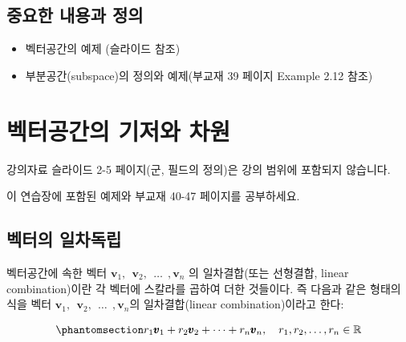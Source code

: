 \documentclass[
  11pt,
  a4paper,
  oneside]{scrbook}
\providecommand{\tightlist}{%
  \setlength{\itemsep}{0pt}\setlength{\parskip}{0pt}}\usepackage{longtable,booktabs,array}
\newcommand{\RR}{\mathbb{R}}
\theoremstyle{definition}
\theoremstyle{definition}
\theoremstyle{plain}
\theoremstyle{remark}
\begin{document}
\section{중요한 내용과
정의}\label{uxc911uxc694uxd55c-uxb0b4uxc6a9uxacfc-uxc815uxc758-4}

\begin{itemize}
\tightlist
\item
  벡터공간의 예제 (슬라이드 참조)
\item
  부분공간(subspace)의 정의와 예제(부교재 39 페이지 Example 2.12 참조)
\end{itemize}


\chapter{벡터공간의 기저와 차원}\label{vector_space_base}

\begin{tcolorbox}[enhanced jigsaw, colback=white, colframe=quarto-callout-note-color-frame, opacityback=0, toprule=.15mm, leftrule=.75mm, titlerule=0mm, opacitybacktitle=0.6, title=\textcolor{quarto-callout-note-color}{\faInfo}\hspace{0.5em}{노트}, colbacktitle=quarto-callout-note-color!10!white, breakable, bottomrule=.15mm, bottomtitle=1mm, toptitle=1mm, arc=.35mm, left=2mm, rightrule=.15mm, coltitle=black]

강의자료 슬라이드 2-5 페이지(군, 필드의 정의)은 강의 범위에 포함되지
않습니다.

이 연습장에 포함된 예제와 부교재 40-47 페이지를 공부하세요.

\end{tcolorbox}

\section{벡터의
일차독립}\label{uxbca1uxd130uxc758-uxc77cuxcc28uxb3c5uxb9bd}

벡터공간에 속한 벡터 \(\pmb v_1, ~~ \pmb v_2, ~~\dots ~~, \pmb v_n\) 의
일차결합(또는 선형결합, linear combination)이란 각 벡터에 스칼라를
곱하여 더한 것들이다. 즉 다음과 같은 형태의 식을 벡터
\(\pmb v_1, ~~ \pmb v_2, ~~\dots ~~, \pmb v_n\)의 일차결합(linear
combination)이라고 한다:

\begin{equation}\phantomsection\label{eq-lin-comb}{ r_1 \pmb v_1 + r_2 \pmb v_2 + \cdots + r_n \pmb v_n, \quad r_1,r_2,\dots, r_n \in \RR }\end{equation}
\end{document}

